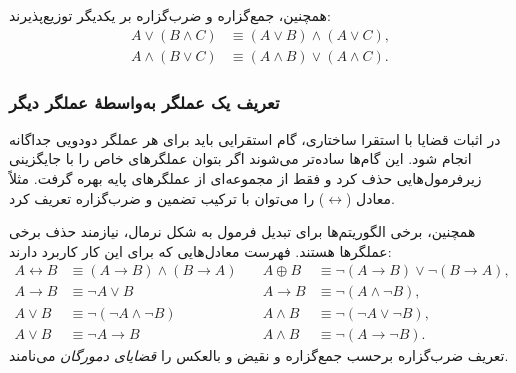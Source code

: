       همچنین، جمع‌گزاره و ضرب‌گزاره بر یکدیگر توزیع‌پذیرند:
      \[
      \begin{aligned}
      A \lor (B \land C) &\equiv (A \lor B) \land (A \lor C),\\
      A \land (B \lor C) &\equiv (A \land B) \lor (A \land C).
      \end{aligned}
      \]
      
      \subsubsection*{تعریف یک عملگر به‌واسطهٔ عملگر دیگر}
      در اثبات قضایا با استقرا ساختاری، گام استقرایی باید برای هر عملگر دودویی جداگانه انجام شود. این گام‌ها ساده‌تر می‌شوند اگر بتوان عملگرهای خاص را با جایگزینی زیرفرمول‌هایی حذف کرد و فقط از مجموعه‌ای از عملگرهای پایه بهره گرفت. مثلاً معادل (\(\leftrightarrow\)) را می‌توان با ترکیب تضمین و ضرب‌گزاره تعریف کرد.
      
      همچنین، برخی الگوریتم‌ها برای تبدیل فرمول به شکل نرمال، نیازمند حذف برخی عملگرها هستند. فهرست معادل‌هایی که برای این کار کاربرد دارند:
      \[
      \begin{aligned}
      A \leftrightarrow B &\equiv (A \to B) \land (B \to A)
      &\quad
      A \oplus B &\equiv \neg(A \to B) \lor \neg(B \to A),\\
      A \to B &\equiv \neg A \lor B
      &\quad
      A \to B &\equiv \neg(A \land \neg B),\\
      A \lor B &\equiv \neg(\neg A \land \neg B)
      &\quad
      A \land B &\equiv \neg(\neg A \lor \neg B),\\
      A \lor B &\equiv \neg A \to B
      &\quad
      A \land B &\equiv \neg(A \to \neg B).
      \end{aligned}
      \]
      تعریف ضرب‌گزاره برحسب جمع‌گزاره و نقیض و بالعکس را \emph{قضایای دمورگان}  می‌نامند.